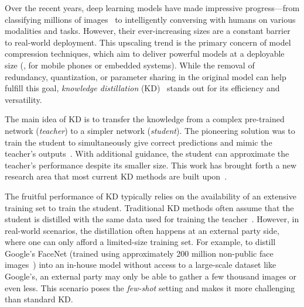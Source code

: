 \begin{foldable}
  Over the recent years, deep learning models have made impressive progress---from classifying millions of images~\cite{russakovsky2015imagenet} to intelligently conversing with humans on various modalities and tasks.
  However, their ever-increasing sizes are a constant barrier to real-world deployment.
  This upscaling trend is the primary concern of model compression techniques, which aim to deliver powerful models at a deployable size (\eg, for mobile phones or embedded systems).
  While the removal of redundancy, quantization, or parameter sharing in the original model can help fulfill this goal, \textit{knowledge distillation} (KD)~\cite{hinton2015distilling} stands out for its efficiency and versatility.
\end{foldable}

\begin{foldable}
  The main idea of KD is to transfer the knowledge from a complex pre-trained network (\textit{teacher}) to a simpler network (\textit{student}).
  The pioneering solution was to train the student to simultaneously give correct predictions and mimic the teacher's outputs~\cite{hinton2015distilling}.
  With additional guidance, the student can approximate the teacher's performance despite its smaller size.
  This work has brought forth a new research area that most current KD methods are built upon~\cite{chen2017learning,meng2019conditional,nguyen2021knowledge}.
\end{foldable}

\begin{foldable}
  The fruitful performance of KD typically relies on the availability of an extensive training set to train the student.
  Traditional KD methods often assume that the student is distilled with the same data used for training the teacher~\cite{hinton2015distilling,kim2018paraphrasing,ahn2019variational,tian2020contrastive}.
  However, in real-world scenarios, the distillation often happens at an external party side, where one can only afford a limited-size training set.
  For example, to distill Google's FaceNet (trained using approximately 200 million non-public face images~\cite{schroff2015facenet}) into an in-house model without access to a large-scale dataset like Google's, an external party may only be able to gather a few thousand images or even less.
  This scenario poses the \textit{few-shot} setting and makes it more challenging than standard KD.
\end{foldable}

